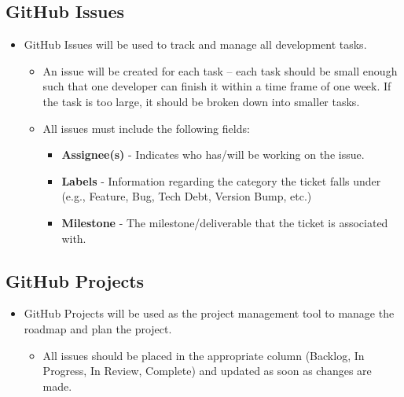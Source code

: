 \documentclass{article}
\begin{document}
\subsection{GitHub Issues}
\begin{itemize}
    \item GitHub Issues will be used to track and manage all development tasks.
    \begin{itemize}
        \item An issue will be created for each task -- each task should be
        small enough such that one developer can finish it within a time frame
        of one week. If the task is too large, it should be broken down into
        smaller tasks.
        \item All issues must include the following fields:
        \begin{itemize}
            \item \textbf{Assignee(s)} - Indicates who has/will be working on
            the issue.
            \item \textbf{Labels} - Information regarding the category the
            ticket falls under (e.g., Feature, Bug, Tech Debt, Version Bump,
            etc.)
            \item \textbf{Milestone} - The milestone/deliverable that the ticket
            is associated with.
        \end{itemize}
    \end{itemize}
\end{itemize}

\subsection{GitHub Projects}
\begin{itemize}
    \item GitHub Projects will be used as the project management tool to manage
    the roadmap and plan the project.
    \begin{itemize}
        \item All issues should be placed in the appropriate column (Backlog, In
        Progress, In Review, Complete) and updated as soon as changes are made.
    \end{itemize}
\end{itemize}
\end{document}
